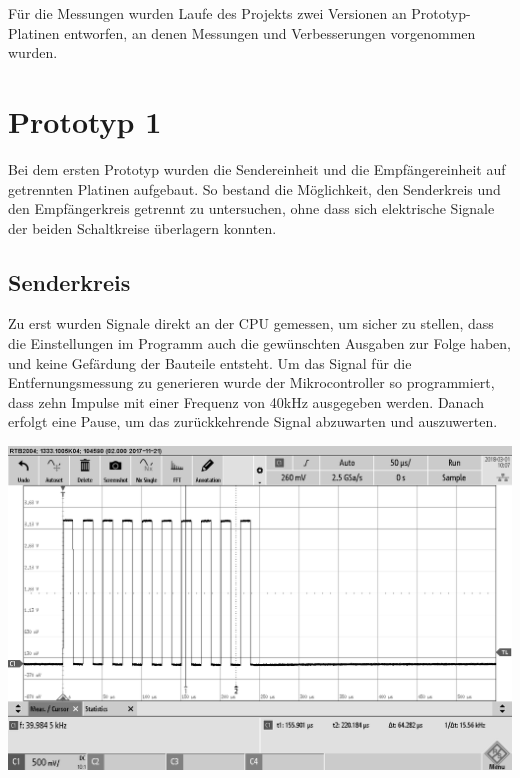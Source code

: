 Für die Messungen wurden Laufe des Projekts zwei Versionen an Prototyp-Platinen entworfen, an denen Messungen und Verbesserungen vorgenommen wurden. 
\section{Prototyp 1}
Bei dem ersten Prototyp wurden die Sendereinheit und die Empfängereinheit auf getrennten Platinen aufgebaut. So bestand die Möglichkeit, den Senderkreis und den Empfängerkreis getrennt zu untersuchen, ohne dass sich elektrische Signale der beiden Schaltkreise überlagern konnten.

\subsection{Senderkreis}
Zu erst wurden Signale direkt an der CPU gemessen, um sicher zu stellen, dass die Einstellungen im Programm auch die gewünschten Ausgaben zur Folge haben, und keine Gefärdung der Bauteile entsteht.
Um das Signal für die Entfernungsmessung zu generieren wurde der Mikrocontroller so programmiert, dass zehn Impulse mit einer Frequenz von 40kHz ausgegeben werden. Danach erfolgt eine Pause, um das zurückkehrende Signal abzuwarten und auszuwerten.\\
\begin{minipage}{0.5\textwidth}
\includegraphics[width=1\textwidth%
]{Abbildungen/MessungenP1/PWM-von-der-cpu.png}
\label{fig:pwm-burst}
\end{minipage}
